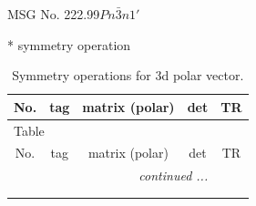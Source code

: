 \documentclass[fleqn,8pt]{jsarticle}
\begin{document}
\setcounter{MaxMatrixCols}{32}

\renewcommand{\tablename}{Table~}
\renewcommand{\figurename}{Figure~}
\begin{center}
\LARGE
MSG No. 222.99\quad$Pn\bar{3}n1'$
\end{center}
* symmetry operation
\renewcommand{\arraystretch}{1.3}
\begin{longtable}{ccccc}
\caption{Symmetry operations for 3d polar vector.}
 \\
 \hline \hline
No. & tag & matrix (polar) & det & TR \\ \hline \endfirsthead

\multicolumn{4}{l}{\tablename\ \thetable{}} \\
 \hline \hline
No. & tag & matrix (polar) & det & TR \\ \hline \endhead

 \hline \hline
\multicolumn{4}{r}{\footnotesize\it continued ...} \\ \endfoot

 \hline \hline
\multicolumn{4}{r}{} \\ \endlastfoot


\end{longtable}
\end{document}
